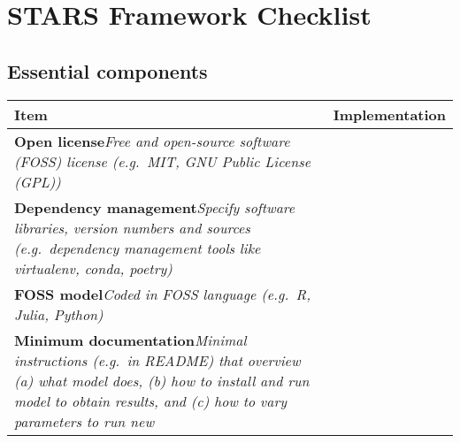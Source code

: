 \hypertarget{stars-framework-checklist}{%
\section{STARS Framework Checklist}\label{stars-framework-checklist}}

\hypertarget{essential-components}{%
\subsection{Essential components}\label{essential-components}}

\begin{longtable}[]{@{}ll@{}}
\toprule
\begin{minipage}[b]{0.47\columnwidth}\raggedright
Item\strut
\end{minipage} & \begin{minipage}[b]{0.47\columnwidth}\raggedright
Implementation\strut
\end{minipage}\tabularnewline
\midrule
\endhead
\begin{minipage}[t]{0.47\columnwidth}\raggedright
\textbf{Open license}\emph{Free and open-source software (FOSS) license
(e.g.~MIT, GNU Public License (GPL))}\strut
\end{minipage} & \begin{minipage}[t]{0.47\columnwidth}\raggedright
\strut
\end{minipage}\tabularnewline
\begin{minipage}[t]{0.47\columnwidth}\raggedright
\textbf{Dependency management}\emph{Specify software libraries, version
numbers and sources (e.g.~dependency management tools like virtualenv,
conda, poetry)}\strut
\end{minipage} & \begin{minipage}[t]{0.47\columnwidth}\raggedright
\strut
\end{minipage}\tabularnewline
\begin{minipage}[t]{0.47\columnwidth}\raggedright
\textbf{FOSS model}\emph{Coded in FOSS language (e.g.~R, Julia,
Python)}\strut
\end{minipage} & \begin{minipage}[t]{0.47\columnwidth}\raggedright
\strut
\end{minipage}\tabularnewline
\begin{minipage}[t]{0.47\columnwidth}\raggedright
\textbf{Minimum documentation}\emph{Minimal instructions (e.g.~in
README) that overview (a) what model does, (b) how to install and run
model to obtain results, and (c) how to vary parameters to run new
}
\end{minipage}
\end{longtable}
